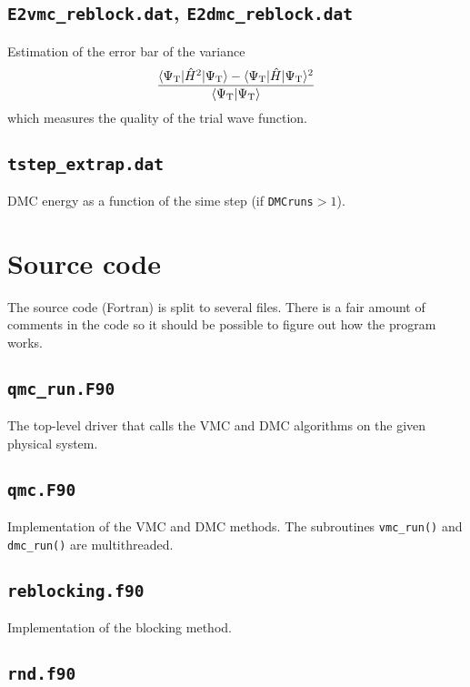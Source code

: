 \documentclass[12pt,a4paper]{article}
\def\code#1{{\lstinline$#1$}}
\begin{document}
\subsection{\code{E2vmc_reblock.dat}, \code{E2dmc_reblock.dat}}

Estimation of the error bar of the variance
\begin{equation}
\frac{%
\langle\Psi_\text{T}|\hat H^2|\Psi_\text{T}\rangle
 - \langle\Psi_\text{T}|\hat H|\Psi_\text{T}\rangle^2
}{%
\langle\Psi_\text{T}|\Psi_\text{T}\rangle
}
\end{equation}
which measures the quality of the trial wave function.

\subsection{\code{tstep_extrap.dat}}

DMC energy as a function of the sime step (if \code{DMCruns}${}>1$).



\section{Source code}

The source code (Fortran) is split to several files. There is a fair
amount of comments in the code so it should be possible to figure out
how the program works.

\subsection{\code{qmc_run.F90}}

The top-level driver that calls the VMC and DMC algorithms on the
given physical system.

\subsection{\code{qmc.F90}}

Implementation of the VMC and DMC methods. The subroutines
\code{vmc_run()} and \code{dmc_run()} are multithreaded.

\subsection{\code{reblocking.f90}}

Implementation of the blocking method.

\subsection{\code{rnd.f90}}
\end{document}
